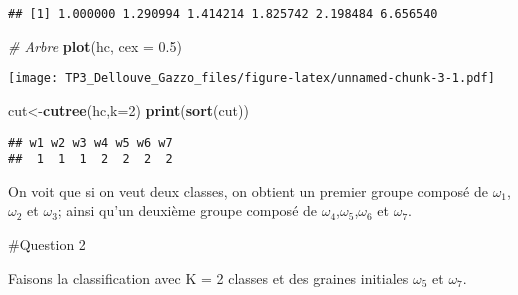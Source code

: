 \documentclass[
]{article}
\newenvironment{Shaded}{\begin{snugshade}}{\end{snugshade}}
\newcommand{\CommentTok}[1]{\textcolor[rgb]{0.56,0.35,0.01}{\textit{#1}}}
\newcommand{\DataTypeTok}[1]{\textcolor[rgb]{0.13,0.29,0.53}{#1}}
\newcommand{\DecValTok}[1]{\textcolor[rgb]{0.00,0.00,0.81}{#1}}
\newcommand{\FloatTok}[1]{\textcolor[rgb]{0.00,0.00,0.81}{#1}}
\newcommand{\KeywordTok}[1]{\textcolor[rgb]{0.13,0.29,0.53}{\textbf{#1}}}
\newcommand{\NormalTok}[1]{#1}
\begin{document}
\begin{verbatim}
## [1] 1.000000 1.290994 1.414214 1.825742 2.198484 6.656540
\end{verbatim}

\begin{Shaded}
\begin{Highlighting}[]
\CommentTok{# Arbre}
\KeywordTok{plot}\NormalTok{(hc, }\DataTypeTok{cex =} \FloatTok{0.5}\NormalTok{)}
\end{Highlighting}
\end{Shaded}

\texttt{[image: TP3\_Dellouve\_Gazzo\_files/figure-latex/unnamed-chunk-3-1.pdf]}

\begin{Shaded}
\begin{Highlighting}[]
\NormalTok{cut<-}\KeywordTok{cutree}\NormalTok{(hc,}\DataTypeTok{k=}\DecValTok{2}\NormalTok{)}
\KeywordTok{print}\NormalTok{(}\KeywordTok{sort}\NormalTok{(cut))}
\end{Highlighting}
\end{Shaded}

\begin{verbatim}
## w1 w2 w3 w4 w5 w6 w7 
##  1  1  1  2  2  2  2
\end{verbatim}

On voit que si on veut deux classes, on obtient un premier groupe
composé de \(\omega_1\),\(\omega_2\) et \(\omega_3\); ainsi qu'un
deuxième groupe composé de \(\omega_4\),\(\omega_5\),\(\omega_6\) et
\(\omega_7\).

\begin{Shaded}
\end{Shaded}

\#Question 2

Faisons la classiﬁcation avec K = 2 classes et des graines initiales
\(\omega_5\) et \(\omega_7\).
\end{document}
